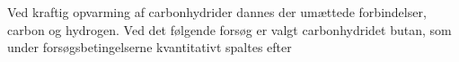 
\danskkemi{}

Ved kraftig opvarming af carbonhydrider dannes der umættede forbindelser,
carbon og hydrogen.
Ved det følgende forsøg er valgt carbonhydridet butan, som under forsøgsbetingelserne
kvantitativt spaltes efter
